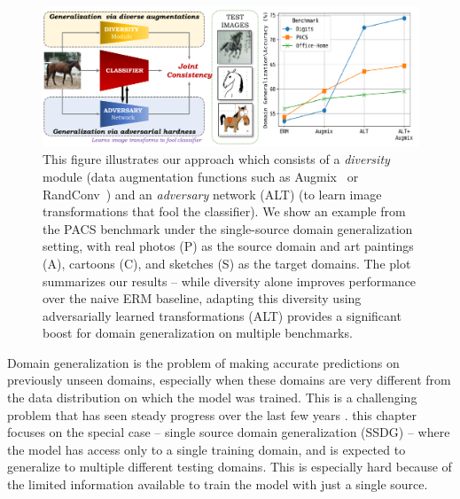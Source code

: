 \begin{figure}
    \centering
    \includegraphics[width=\linewidth]{alt/figures/alt_teaser.pdf}
    \caption{
    This figure illustrates our approach which consists of a \textit{diversity} module (data augmentation functions such as Augmix~\citep{hendrycks2019augmix} or RandConv~\citep{xu2020robust}) and an \textit{adversary} network (ALT) (to learn image transformations that fool the classifier).
    We show an example from the PACS benchmark under the single-source domain generalization setting, with real photos (P) as the source domain and art paintings (A), cartoons (C), and sketches (S) as the target domains.
    The plot summarizes our results -- while diversity alone improves performance over the naive ERM baseline, adapting this diversity using adversarially learned transformations (ALT) provides a significant boost for domain generalization on multiple benchmarks.}
    \label{fig:alt_teaser}
\end{figure}


Domain generalization is the problem of making accurate predictions on previously unseen domains, especially when these domains are very different from the data distribution on which the model was trained. 
This is a challenging problem that has seen steady progress over the last few years \citep{carlucci2019domain,volpi2018generalizing,qiao2020learning,xu2020robust,nam2021reducing}. 
this chapter focuses on the special case -- single source domain generalization (SSDG) -- where the model has access only to a single training domain, and is expected to generalize to multiple different testing domains. 
This is especially hard because of the limited information available to train the model with just a single source. 

